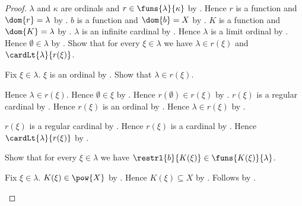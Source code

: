\begin{proof}
    $\lambda$ and $\kappa$ are ordinals and
        $r\in\funs{\lambda}{\kappa}$ by
        .
    Hence $r$ is a function and $\dom{r}=\lambda$ by
        .
    $b$ is a function and $\dom{b}=X$ by
        .
    $K$ is a function and $\dom{K}=\lambda$ by
        .
    $\lambda$ is an infinite cardinal by .
    Hence $\lambda$ is a limit ordinal by
        .
    Hence $\emptyset\in\lambda$ by .
    Show that for every $\xi\in\lambda$ we have
        $\lambda\in r(\xi)$ and $\cardLt{\lambda}{r(\xi)}$.
    \begin{subproof}
        Fix $\xi\in\lambda$.
        $\xi$ is an ordinal by .
        Show that $\lambda\in r(\xi)$.
        \begin{subproof}
            \begin{byCase}
                    Hence $\lambda\in r(\xi)$.
                    Hence $\emptyset\in\xi$ by
                        .
                    Hence $r(\emptyset)\in r(\xi)$ by
                        .
                    $r(\xi)$ is a regular cardinal by
                        .
                    Hence $r(\xi)$ is an ordinal by
                        .
                    Hence $\lambda\in r(\xi)$ by
                        .
            \end{byCase}
        \end{subproof}
        $r(\xi)$ is a regular cardinal by
            .
        Hence $r(\xi)$ is a cardinal by .
        Hence $\cardLt{\lambda}{r(\xi)}$ by
            .
    \end{subproof}
    Show that for every $\xi\in\lambda$ we have
        $\restrl{b}{K(\xi)}\in\funs{K(\xi)}{\lambda}$.
    \begin{subproof}
        Fix $\xi\in\lambda$.
        $K(\xi)\in\pow{X}$ by .
        Hence $K(\xi)\subseteq X$ by .
        Follows by .

\end{subproof}
\end{proof}
